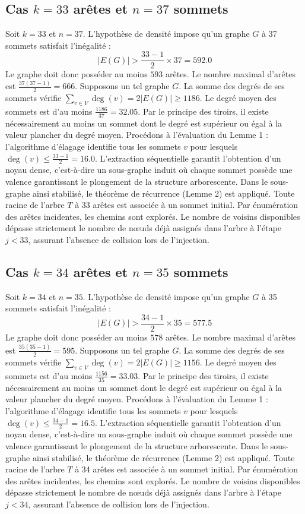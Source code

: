 \documentclass[12pt,a4paper]{article}
\begin{document}
\subsection{Cas $k = 33$ arêtes et $n = 37$ sommets}
Soit $k = 33$ et $n = 37$. L'hypothèse de densité impose qu'un graphe $G$ à 37 sommets satisfait l'inégalité :
$$ |E(G)| > \frac{33-1}{2} \times 37 = 592.0 $$
Le graphe doit donc posséder au moins $593$ arêtes. Le nombre maximal d'arêtes est $\frac{37(37-1)}{2} = 666$.
Supposons un tel graphe $G$. La somme des degrés de ses sommets vérifie $\sum_{v \in V} \deg(v) = 2|E(G)| \geq 1186$.
Le degré moyen des sommets est d'au moins $\frac{1186}{37} = 32.05$.
Par le principe des tiroirs, il existe nécessairement au moins un sommet dont le degré est supérieur ou égal à la valeur plancher du degré moyen.
Procédons à l'évaluation du Lemme 1 : l'algorithme d'élagage identifie tous les sommets $v$ pour lesquels $\deg(v) \leq \frac{33-1}{2} = 16.0$.
L'extraction séquentielle garantit l'obtention d'un noyau dense, c'est-à-dire un sous-graphe induit où chaque sommet possède une valence garantissant le plongement de la structure arborescente.
Dans le sous-graphe ainsi stabilisé, le théorème de récurrence (Lemme 2) est appliqué. Toute racine de l'arbre $T$ à 33 arêtes est associée à un sommet initial. Par énumération des arêtes incidentes, les chemins sont explorés. Le nombre de voisins disponibles dépasse strictement le nombre de nœuds déjà assignés dans l'arbre à l'étape $j < 33$, assurant l'absence de collision lors de l'injection.

\subsection{Cas $k = 34$ arêtes et $n = 35$ sommets}
Soit $k = 34$ et $n = 35$. L'hypothèse de densité impose qu'un graphe $G$ à 35 sommets satisfait l'inégalité :
$$ |E(G)| > \frac{34-1}{2} \times 35 = 577.5 $$
Le graphe doit donc posséder au moins $578$ arêtes. Le nombre maximal d'arêtes est $\frac{35(35-1)}{2} = 595$.
Supposons un tel graphe $G$. La somme des degrés de ses sommets vérifie $\sum_{v \in V} \deg(v) = 2|E(G)| \geq 1156$.
Le degré moyen des sommets est d'au moins $\frac{1156}{35} = 33.03$.
Par le principe des tiroirs, il existe nécessairement au moins un sommet dont le degré est supérieur ou égal à la valeur plancher du degré moyen.
Procédons à l'évaluation du Lemme 1 : l'algorithme d'élagage identifie tous les sommets $v$ pour lesquels $\deg(v) \leq \frac{34-1}{2} = 16.5$.
L'extraction séquentielle garantit l'obtention d'un noyau dense, c'est-à-dire un sous-graphe induit où chaque sommet possède une valence garantissant le plongement de la structure arborescente.
Dans le sous-graphe ainsi stabilisé, le théorème de récurrence (Lemme 2) est appliqué. Toute racine de l'arbre $T$ à 34 arêtes est associée à un sommet initial. Par énumération des arêtes incidentes, les chemins sont explorés. Le nombre de voisins disponibles dépasse strictement le nombre de nœuds déjà assignés dans l'arbre à l'étape $j < 34$, assurant l'absence de collision lors de l'injection.
\end{document}
